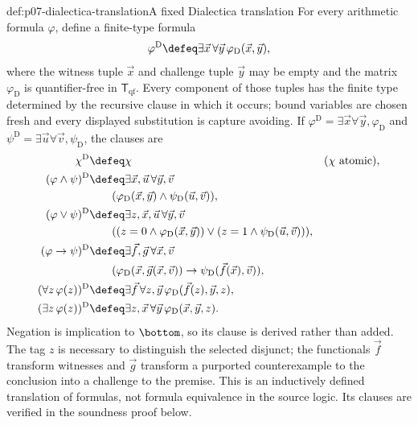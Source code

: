 \begin{hbdefinition}{def:p07-dialectica-translation}{A fixed Dialectica translation}
For every arithmetic formula \(\varphi\), define a finite-type formula
\[
 \varphi^{\mathrm D}\defeq
 \exists\vec x\,\forall\vec y\,
 \varphi_{\mathrm D}(\vec x,\vec y),
\]
where the witness tuple \(\vec x\) and challenge tuple \(\vec y\) may be
empty and the matrix \(\varphi_{\mathrm D}\) is quantifier-free in
\(\mathsf T_{\mathrm{qf}}\).  Every component of those tuples has the finite
type determined by the recursive clause in which it occurs; bound variables
are chosen fresh and every displayed substitution is capture avoiding.  If
\(\varphi^{\mathrm D}=\exists\vec x\forall\vec y,\varphi_{\mathrm D}\) and
\(\psi^{\mathrm D}=\exists\vec u\forall\vec v,\psi_{\mathrm D}\), the clauses are
\[
\begin{aligned}
 \chi^{\mathrm D}
   &\defeq \chi &&(\chi\text{ atomic}),\\
 (\varphi\land\psi)^{\mathrm D}
   &\defeq \exists\vec x,\vec u\,\forall\vec y,\vec v\,\\
   &\qquad (\varphi_{\mathrm D}(\vec x,\vec y)\land
        \psi_{\mathrm D}(\vec u,\vec v)),\\
 (\varphi\lor\psi)^{\mathrm D}
   &\defeq \exists z,\vec x,\vec u\,\forall\vec y,\vec v\,\\
   &\qquad ((z=0\land\varphi_{\mathrm D}(\vec x,\vec y))\lor
        (z=1\land\psi_{\mathrm D}(\vec u,\vec v))),\\
 (\varphi\to\psi)^{\mathrm D}
   &\defeq \exists\vec f,\vec g\,\forall\vec x,\vec v\,\\
   &\qquad (\varphi_{\mathrm D}(\vec x,\vec g(\vec x,\vec v))\to
        \psi_{\mathrm D}(\vec f(\vec x),\vec v)),\\
 (\forall z\,\varphi(z))^{\mathrm D}
   &\defeq \exists\vec f\,\forall z,\vec y\,
       \varphi_{\mathrm D}(\vec f(z),\vec y,z),\\
 (\exists z\,\varphi(z))^{\mathrm D}
   &\defeq \exists z,\vec x\,\forall\vec y\,
       \varphi_{\mathrm D}(\vec x,\vec y,z).
\end{aligned}
\]
Negation is implication to \(\bottom\), so its clause is derived rather than
added.  The tag \(z\) is necessary to distinguish the selected disjunct;
the functionals \(\vec f\) transform witnesses and \(\vec g\) transform a
purported counterexample to the conclusion into a challenge to the premise.
This is an inductively defined translation of formulas, not formula
equivalence in the source logic.  Its clauses are verified in the
soundness proof below.
\end{hbdefinition}

